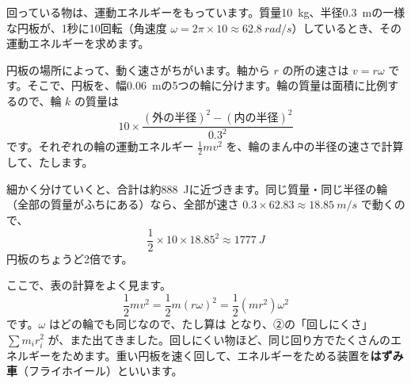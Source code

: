 
\leavevmode\label{ph:力-6:sec4}回っている物は、運動エネルギーをもっています。質量\qty{10}{kg}、半径\qty{0.3}{m}の一様な円板が、1秒に10回転（角速度 $\omega=2\pi\times10\approx\qty{62.8}{rad/s}$）しているとき、その運動エネルギーを求めます。

円板の場所によって、動く速さがちがいます。軸から $r$ の所の速さは $v=r\omega$ です。そこで、円板を、幅\qty{0.06}{m}の5つの輪に分けます。輪の質量は面積に比例するので、輪 $k$ の質量は
\[ 10\times\frac{(\text{外の半径})^2-(\text{内の半径})^2}{0.3^2} \]
です。それぞれの輪の運動エネルギー $\tfrac{1}{2}mv^2$ を、輪のまん中の半径の速さで計算して、たします。

\begin{bkcenter}
\end{bkcenter}

\noindent 細かく分けていくと、合計は約\qty{888}{J}に近づきます。同じ質量・同じ半径の輪（全部の質量がふちにある）なら、全部が速さ $0.3\times62.83\approx\qty{18.85}{m/s}$ で動くので、
\[ \frac{1}{2}\times10\times18.85^2\approx\qty{1777}{J} \]
円板のちょうど2倍です。

ここで、表の計算をよく見ます。
\[ \frac{1}{2}mv^2=\frac{1}{2}m(r\omega)^2=\frac{1}{2}(mr^2)\omega^2 \]
です。$\omega$ はどの輪でも同じなので、たし算は
となり、②の「回しにくさ」$\sum m_ir_i^2$ が、また出てきました。回しにくい物ほど、同じ回り方でたくさんのエネルギーをためます。重い円板を速く回して、エネルギーをためる装置を\textbf{はずみ車}（フライホイール）といいます。

\phkokomade




